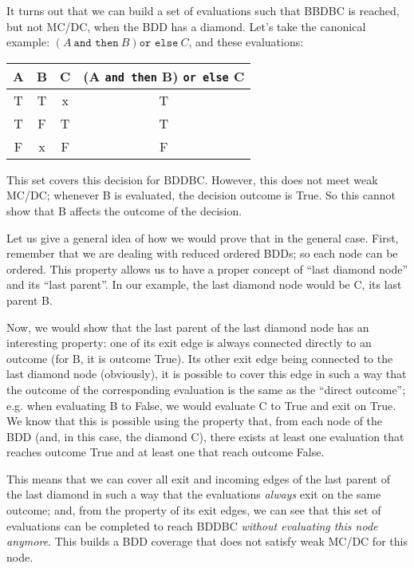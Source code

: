 \documentclass[a4paper,12pt,twoside]{article}
\newcommand{\andthen}{\texttt{and then}}
\newcommand{\orelse}{\texttt{or else}}
\begin{document}
It turns out that we can build a set of evaluations such that BBDBC is
reached, but not MC/DC, when the BDD has a diamond.  Let's take the
canonical example: $(A \ \andthen{} \ B) \orelse{} \ C$, and these
evaluations:

\begin{center}
\begin{tabular}{|c|c|c||c|}
\hline
A & B & C & (A \andthen{} B) \orelse{} C \\ \hline
T & T & x & T \\ \hline
T & F & T & T \\ \hline
F & x & F & F \\ \hline
\end{tabular}
\end{center}

This set covers this decision for BDDBC. However, this does not meet
weak MC/DC; whenever B is evaluated, the decision outcome is True. So
this cannot show that B affects the outcome of the decision.

Let us give a general idea of how we would prove that in the general
case. First, remember that we are dealing with reduced ordered BDDs;
so each node can be ordered. This property allows us to have a
proper concept of ``last diamond node'' and its ``last parent''. In our
example, the last diamond node would be C, its last parent B.

Now, we would show that the last parent of the last diamond node has
an interesting property: one of its exit edge is always connected
directly to an outcome (for B, it is outcome True). Its other exit
edge being connected to the last diamond node (obviously), it is
possible to cover this edge in such a way that the outcome of the
corresponding evaluation is the same as the ``direct outcome'';
e.g. when evaluating B to False, we would evaluate C to True and exit
on True. We know that this is possible using the property that, from
each node of the BDD (and, in this case, the diamond C), there exists
at least one evaluation that reaches outcome True and at least one that
reach outcome False.

This means that we can cover all exit and incoming edges of the last
parent of the last diamond in such a way that the evaluations \textit{always}
exit on the same outcome; and, from the property of its exit edges, we
can see that this set of evaluations can be completed to reach BDDBC
\textit{without evaluating this node anymore}. This builds a BDD coverage
that does not satisfy weak MC/DC for this node.
\end{document}
